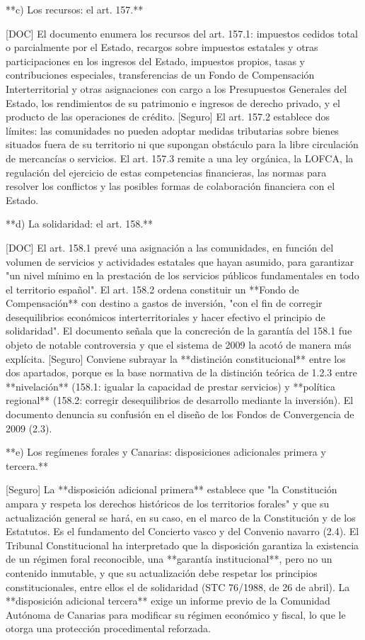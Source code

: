 \documentclass[10pt,a4paper]{article}
\begin{document}
**c) Los recursos: el art. 157.**

[DOC] El documento enumera los recursos del art. 157.1: impuestos cedidos total o parcialmente por el Estado, recargos sobre impuestos estatales y otras participaciones en los ingresos del Estado, impuestos propios, tasas y contribuciones especiales, transferencias de un Fondo de Compensación Interterritorial y otras asignaciones con cargo a los Presupuestos Generales del Estado, los rendimientos de su patrimonio e ingresos de derecho privado, y el producto de las operaciones de crédito. [Seguro] El art. 157.2 establece dos límites: las comunidades no pueden adoptar medidas tributarias sobre bienes situados fuera de su territorio ni que supongan obstáculo para la libre circulación de mercancías o servicios. El art. 157.3 remite a una ley orgánica, la LOFCA, la regulación del ejercicio de estas competencias financieras, las normas para resolver los conflictos y las posibles formas de colaboración financiera con el Estado.

**d) La solidaridad: el art. 158.**

[DOC] El art. 158.1 prevé una asignación a las comunidades, en función del volumen de servicios y actividades estatales que hayan asumido, para garantizar "un nivel mínimo en la prestación de los servicios públicos fundamentales en todo el territorio español". El art. 158.2 ordena constituir un **Fondo de Compensación** con destino a gastos de inversión, "con el fin de corregir desequilibrios económicos interterritoriales y hacer efectivo el principio de solidaridad". El documento señala que la concreción de la garantía del 158.1 fue objeto de notable controversia y que el sistema de 2009 la acotó de manera más explícita. [Seguro] Conviene subrayar la **distinción constitucional** entre los dos apartados, porque es la base normativa de la distinción teórica de 1.2.3 entre **nivelación** (158.1: igualar la capacidad de prestar servicios) y **política regional** (158.2: corregir desequilibrios de desarrollo mediante la inversión). El documento denuncia su confusión en el diseño de los Fondos de Convergencia de 2009 (2.3).

**e) Los regímenes forales y Canarias: disposiciones adicionales primera y tercera.**

[Seguro] La **disposición adicional primera** establece que "la Constitución ampara y respeta los derechos históricos de los territorios forales" y que su actualización general se hará, en su caso, en el marco de la Constitución y de los Estatutos. Es el fundamento del Concierto vasco y del Convenio navarro (2.4). El Tribunal Constitucional ha interpretado que la disposición garantiza la existencia de un régimen foral reconocible, una **garantía institucional**, pero no un contenido inmutable, y que su actualización debe respetar los principios constitucionales, entre ellos el de solidaridad (STC 76/1988, de 26 de abril). La **disposición adicional tercera** exige un informe previo de la Comunidad Autónoma de Canarias para modificar su régimen económico y fiscal, lo que le otorga una protección procedimental reforzada.
\end{document}
